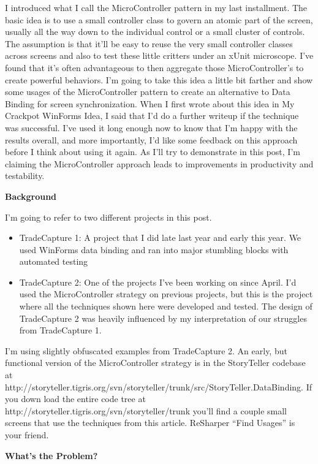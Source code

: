 \documentclass{article}
\begin{document}
{I introduced what I call the MicroController pattern in my last installment.  The basic idea is to use a small controller class to govern an atomic part of the screen, usually all the way down to the individual control or a small cluster of controls.  The assumption is that it'll be easy to reuse the very small controller classes across screens and also to test these little critters under an xUnit microscope.  I've found that it's often advantageous to then aggregate those MicroController's to create powerful behaviors.  I'm going to take this idea a little bit farther and show some usages of the MicroController pattern to create an alternative to Data Binding for screen synchronization.  When I first wrote about this idea in My Crackpot WinForms Idea, I said that I'd do a further writeup if the technique was successful.  I've used it long enough now to know that I'm happy with the results overall, and more importantly, I'd like some feedback on this approach before I think about using it again.  As I'll try to demonstrate in this post, I'm claiming the MicroController approach leads to improvements in productivity and testability.
 
\Large {\textbf{Background}}

I'm going to refer to two different projects in this post.
 \begin{itemize}
    \item  TradeCapture 1:  A project that I did late last year and early this year.  We used WinForms data binding and ran into major stumbling blocks with automated testing  
 \item  TradeCapture 2:  One of the projects I've been working on since April.  I'd used the MicroController strategy on previous projects, but this is the project where all the techniques shown here were developed and tested.  The design of TradeCapture 2 was heavily influenced by my interpretation of our struggles from TradeCapture 1.  
 \end{itemize}

I'm using slightly obfuscated examples from TradeCapture 2. An early, but functional version of the MicroController strategy is in the StoryTeller codebase at http://storyteller.tigris.org/svn/storyteller/trunk/src/StoryTeller.DataBinding.  If you down load the entire code tree at http://storyteller.tigris.org/svn/storyteller/trunk you'll find a couple small screens that use the techniques from this article.  ReSharper “Find Usages” is your friend.
 
\Large {\textbf{What's the Problem?}}

}
\end{document}
